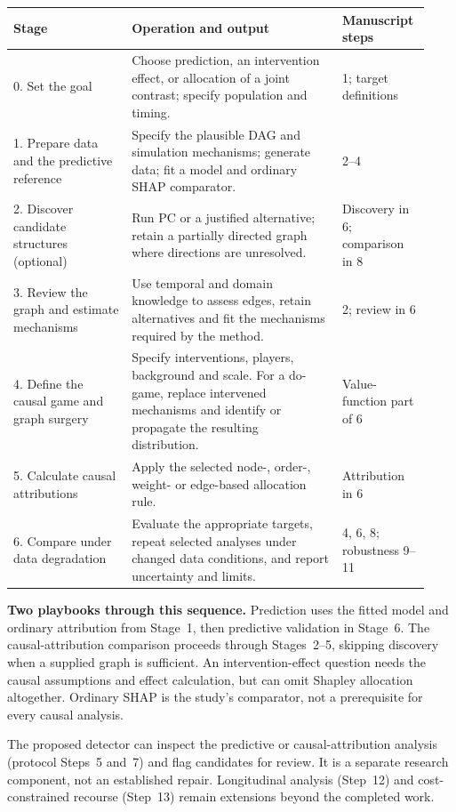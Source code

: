 \documentclass[11pt,letterpaper]{article}
\begin{document}
\begingroup\small\setlength{\tabcolsep}{5pt}
\begin{longtable}{@{}L{0.27\linewidth}L{0.48\linewidth}L{0.18\linewidth}@{}}
\toprule Stage & Operation and output & Manuscript steps\\\midrule{}. Set the goal & Choose prediction, an intervention effect, or allocation of a joint contrast; specify population and timing. & 1; target definitions\\[5pt]
1. Prepare data and the predictive reference & Specify the plausible DAG and simulation mechanisms; generate data; fit a model and ordinary SHAP comparator. & 2--4\\[5pt]
2. Discover candidate structures (optional) & Run PC or a justified alternative; retain a partially directed graph where directions are unresolved. & Discovery in 6; comparison in 8\\[5pt]
3. Review the graph and estimate mechanisms & Use temporal and domain knowledge to assess edges, retain alternatives and fit the mechanisms required by the method. & 2; review in 6\\[5pt]
4. Define the causal game and graph surgery & Specify interventions, players, background and scale. For a do-game, replace intervened mechanisms and identify or propagate the resulting distribution. & Value-function part of 6\\[5pt]
5. Calculate causal attributions & Apply the selected node-, order-, weight- or edge-based allocation rule. & Attribution in 6\\[5pt]
6. Compare under data degradation & Evaluate the appropriate targets, repeat selected analyses under changed data conditions, and report uncertainty and limits. & 4, 6, 8; robustness 9--11\\
\bottomrule
\end{longtable}\endgroup

\textbf{Two playbooks through this sequence.} Prediction uses the fitted model and ordinary attribution from Stage~1, then predictive validation in Stage~6. The causal-attribution comparison proceeds through Stages~2--5, skipping discovery when a supplied graph is sufficient. An intervention-effect question needs the causal assumptions and effect calculation, but can omit Shapley allocation altogether. Ordinary SHAP is the study's comparator, not a prerequisite for every causal analysis.

The proposed detector can inspect the predictive or causal-attribution analysis (protocol Steps~5 and~7) and flag candidates for review. It is a separate research component, not an established repair. Longitudinal analysis (Step~12) and cost-constrained recourse (Step~13) remain extensions beyond the completed work.
\end{document}
